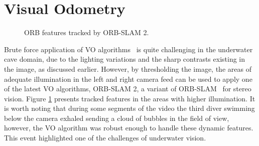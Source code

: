 \section{Visual Odometry}\label{sec:pcvisodom}
 \begin{figure}[th]
 	\centering
 	\caption{ORB features tracked by ORB\hyp SLAM 2.}\vspace{-0.2in}
 	\label{fig:OrbFeatures}
\end{figure}

Brute force application of VO algorithms~\cite{da2009visual,Corke} is quite challenging in the underwater cave domain, due to the lighting variations and the sharp contrasts existing in the image, as discussed earlier. However, by thresholding the image, the areas of adequate illumination in the left and right camera feed can be used to apply one of the latest VO algorithms, ORB\hyp SLAM 2, a variant of ORB\hyp SLAM~\cite{ORB1,murTRO2015} for stereo vision. Figure \ref{fig:OrbFeatures} presents tracked features in the areas with higher illumination. It is worth noting that during some segments of the video the third diver swimming below the camera exhaled sending a cloud of bubbles in the field of view, however, the VO algorithm was robust enough to handle these dynamic features. This event highlighted one of the challenges of underwater vision. 

